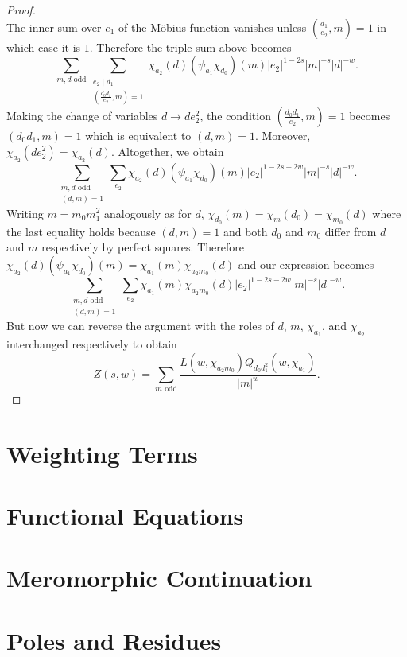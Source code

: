 \documentclass[12pt,reqno,oneside]{amsart}
\begin{document}
\begin{proof}
\[        \]
        The inner sum over $e_{1}$ of the M\"obius function vanishes unless $\left(\frac{d_{1}}{e_{2}},m\right) = 1$ in which case it is $1$. Therefore the triple sum above becomes
        \[
            \sum_{\text{$m,d$ odd}}\sum_{\substack{e_{2} \mid d_{1} \\ \left(\frac{d_{0}d_{1}}{e_{2}},m\right) = 1}}\chi_{a_{2}}(d)(\psi_{a_{1}}\chi_{d_{0}})(m)|e_{2}|^{1-2s}|m|^{-s}|d|^{-w}.
        \]
        Making the change of variables $d \to de_{2}^{2}$, the condition $\left(\frac{d_{0}d_{1}}{e_{2}},m\right) = 1$ becomes $(d_{0}d_{1},m) = 1$ which is equivalent to $(d,m) = 1$. Moreover, $\chi_{a_{2}}(de_{2}^{2}) = \chi_{a_{2}}(d)$. Altogether, we obtain
        \[
            \sum_{\substack{\text{$m,d$ odd} \\ (d,m) = 1}}\sum_{e_{2}}\chi_{a_{2}}(d)(\psi_{a_{1}}\chi_{d_{0}})(m)|e_{2}|^{1-2s-2w}|m|^{-s}|d|^{-w}.
        \]
        Writing $m = m_{0}m_{1}^{2}$ analogously as for $d$,  $\chi_{d_{0}}(m) = \chi_{m}(d_{0}) = \chi_{m_{0}}(d)$ where the last equality holds because $(d,m) = 1$ and both $d_{0}$ and $m_{0}$ differ from $d$ and $m$ respectively by perfect squares. Therefore $\chi_{a_{2}}(d)(\psi_{a_{1}}\chi_{d_{0}})(m) = \chi_{a_{1}}(m)\chi_{a_{2}m_{0}}(d)$ and our expression becomes
        \[
            \sum_{\substack{\text{$m,d$ odd} \\ (d,m) = 1}}\sum_{e_{2}}\chi_{a_{1}}(m)\chi_{a_{2}m_{0}}(d)|e_{2}|^{1-2s-2w}|m|^{-s}|d|^{-w}.
        \]
        But now we can reverse the argument with the roles of $d$, $m$, $\chi_{a_{1}}$, and $\chi_{a_{2}}$ interchanged respectively to obtain
        \[
            Z(s,w) = \sum_{\text{$m$ odd}}\frac{L(w,\chi_{a_{2}m_{0}})Q_{d_{0}d_{1}^{2}}(w,\chi_{a_{1}})}{|m|^{w}}.
        \]
    \end{proof}


\section*{Weighting Terms}
\section*{Functional Equations}
\section*{Meromorphic Continuation}
\section*{Poles and Residues}
\end{document}
